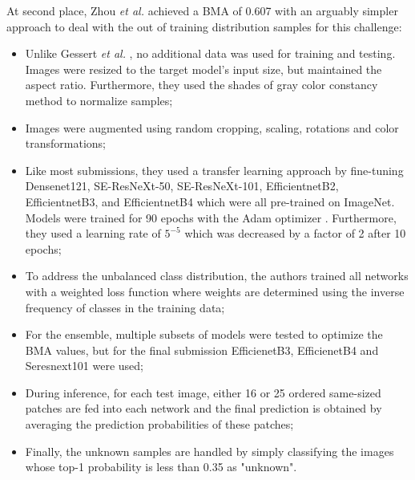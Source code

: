     At second place, Zhou \textit{et al.} \cite{isic2019second} achieved a \ac{BMA} of 0.607 with an arguably simpler approach to deal with the out of training distribution samples for this challenge:
    \begin{itemize}
        \item Unlike Gessert \textit{et al.} \cite{isic2019first}, no additional data was used for training and testing. Images were resized to the target model's input size, but maintained the aspect ratio. Furthermore, they used the shades of gray color constancy method \cite{shadesgray} to normalize samples;
        
        \item Images were augmented using random cropping, scaling, rotations and color transformations;
        
        \item Like most submissions, they used a transfer learning approach by fine-tuning Densenet121, SE-ResNeXt-50, SE-ResNeXt-101, EfficientnetB2, EfficientnetB3, and EfficientnetB4 which were all pre-trained on ImageNet. Models were trained for 90 epochs with the Adam optimizer \cite{adam}. Furthermore, they used a learning rate of $5^{-5}$ which was decreased by a factor of 2 after 10 epochs;
        
        \item To address the unbalanced class distribution, the authors trained all networks with a weighted loss function where weights are determined using the inverse frequency of classes in the training data;
        
        \item For the ensemble, multiple subsets of models were tested to optimize the \ac{BMA} values, but for the final submission EfficienetB3, EfficienetB4 and Seresnext101 were used;
        
        \item During inference, for each test image, either 16 or 25 ordered same-sized patches are fed into each network and the final prediction is obtained by averaging the prediction probabilities of these patches;
        
        \item Finally, the unknown samples are handled by simply classifying the images whose top-1 probability is less than 0.35 as "unknown".
    \end{itemize}
    
